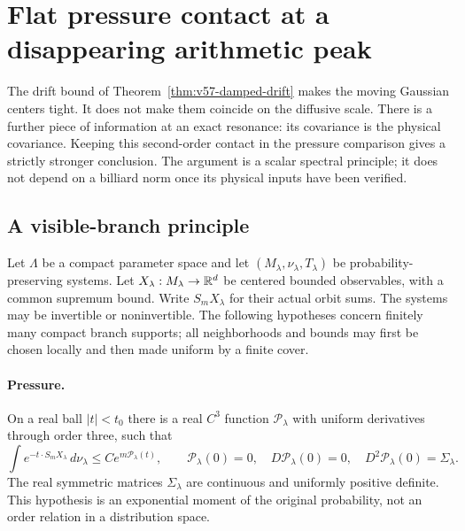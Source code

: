 \section{Flat pressure contact at a disappearing arithmetic peak}
\label{sec:v58-pressure-contact}
The drift bound of Theorem~\ref{thm:v57-damped-drift} makes the
moving Gaussian centers tight. It does not make them coincide on the
diffusive scale. There is a further piece of information at an exact
resonance: its covariance is the physical covariance. Keeping this
second-order contact in the pressure comparison gives a strictly
stronger conclusion. The argument is a scalar spectral principle;
it does not depend on a billiard norm once its physical inputs have
been verified.

\subsection{A visible-branch principle}
Let $\Lambda$ be a compact parameter space and let
$(M_\lambda,\nu_\lambda,T_\lambda)$ be probability-preserving systems.
Let $X_\lambda:M_\lambda\to\mathbb R^d$ be centered bounded observables,
with a common supremum bound. Write $S_mX_\lambda$ for their actual
orbit sums. The systems may be invertible or noninvertible. The
following hypotheses concern finitely many compact branch supports;
all neighborhoods and bounds may first be chosen locally and then
made uniform by a finite cover.

\paragraph{Pressure.}
On a real ball $|t|<t_0$ there is a real $C^3$ function
$\mathscr P_\lambda$ with uniform derivatives through order three,
such that
\begin{equation}\label{eq:v58-pressure-input}
 \int e^{-t\cdot S_mX_\lambda}\,d\nu_\lambda
       \le C e^{m\mathscr P_\lambda(t)},\qquad
 \mathscr P_\lambda(0)=0,\quad
 D\mathscr P_\lambda(0)=0,\quad
 D^2\mathscr P_\lambda(0)=\Sigma_\lambda.
\end{equation}
The real symmetric matrices $\Sigma_\lambda$ are continuous and
uniformly positive definite. This hypothesis is an exponential moment
of the original probability, not an order relation in a distribution
space.

